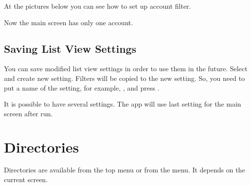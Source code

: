 \documentclass[a4paper,10pt,english]{sphinxmanual}
\begin{document}
At the pictures below you can see how to set up account filter.

\noindent{}
\noindent{}
\noindent{}
\noindent{}
\noindent{}
\noindent{}

Now the main screen has only one  account.


\section{Saving List View Settings}
\label{\detokenize{main-screen:saving-list-view-settings}}
You can save modified list view settings in order to use them in the future. Select
 and create new setting. Filters will be copied to the new setting.
So, you need to put a name of the setting, for example, , and
press .

\noindent{}
\noindent{}

It is possible to have several settings. The app will use last setting for the main screen
after run.


\chapter{Directories}
\label{\detokenize{directories:directories}}\label{\detokenize{directories:chapter-directories}}\label{\detokenize{directories::doc}}
Directories are available from the top menu or from the  menu.
It depends on the current screen.

\noindent{}
\noindent{}
\end{document}
